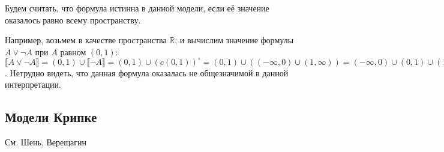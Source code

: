 Будем считать, что формула истинна в данной модели, если её значение оказалось равно
всему пространству. 

Например, возьмем в качестве пространства $\mathbb{R}$, и вычислим значение формулы $A \vee \neg A$ 
при $A$ равном $(0,1)$: $\llbracket A \vee \neg A \rrbracket = (0,1) \cup \llbracket \neg A \rrbracket = 
(0,1) \cup (c(0,1))^\circ = (0,1) \cup ((-\infty,0)\cup(1,\infty)) = (-\infty,0)\cup(0,1)\cup(1,\infty)$.
Нетрудно видеть, что данная формула оказалась не общезначимой в данной интерпретации.

\subsection{Модели Крипке}

См. Шень, Верещагин
